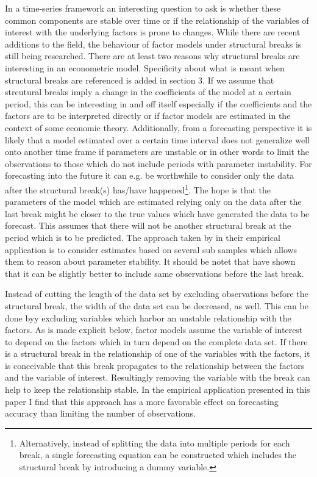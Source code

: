 \documentclass[12pt]{article}
\begin{document}
In a time-series framework an interesting question to ask is whether these common components are stable over time or if the relationship of the variables of interest with the underlying factors is prone to changes. While there are recent additions to the field, the behaviour of factor models under structural breaks is still being researched. There are at least two reasons why structural breaks are interesting in an econometric model. Specificity about what is meant when structural breaks are referenced is added in section 3. If we assume that strcutural breaks imply a change in the coefficients of the model at a certain period, this can be interesting in and off itself especially if the coefficients and the factors are to be interpreted directly or if factor models are estimated in the context of some economic theory. Additionally, from a forecasting perspective it is likely that a model estimated over a certain time interval does not generalize well onto another time frame if parameters are unstable or in other words to limit the observations to those which do not include periods with parameter instability. For forecasting into the future it can e.g. be worthwhile to consider only the data after the structural break(s) has/have happened\footnote{Alternatively, instead of splitting the data into multiple periods for each break, a single forecasting equation can be constructed which includes the structural break by introducing a dummy variable.}. The hope is that the parameters of the model which are estimated relying only on the data after the last break might be closer to the true values which have generated the data to be forecast. This assumes that there will not be another structural break at the period which is to be predicted. The approach taken by \citet{bai2008} in their empirical application is to consider estimates based on several sub samples which allows them to reason about parameter stability.
It should be notet that \citet{pesaran2007selection} have shown that it can be slightly better to include same observations before the last break. 

Instead of cutting the length of the data set by excluding observations before the structural break, the width of the data set can be decreased, as well. This can be done byy excluding variables which harbor an unstable relationship with the factors. As is made explicit below, factor models assume the variable of interest to depend on the factors which in turn depend on the complete data set. If there is a structural break in the relationship of one of the variables with the factors, it is conceivable that this break propagates to the relationship between the factors and the variable of interest. Resultingly removing the variable with the break can help to keep the relationship stable. In the empirical application presented in this paper I find that this approach has a more favorable effect on forecasting accuracy than limiting the number of observations.
\end{document}
